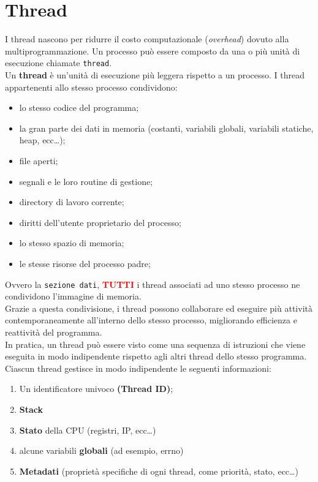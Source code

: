 \section{Thread}
I thread nascono per ridurre il costo computazionale (\textit{overhead}) dovuto alla multiprogrammazione.  
Un processo può essere composto da una o più unità di esecuzione chiamate \texttt{thread}.\\
Un \textbf{thread} è un'unità di esecuzione più leggera rispetto a un processo.  
I thread appartenenti allo stesso processo condividono:
\begin{itemize}
    \item lo stesso codice del programma;
    \item la gran parte dei dati in memoria (costanti, variabili globali,
    variabili statiche, heap, ecc\dots);
    \item file aperti;
    \item segnali e le loro routine di gestione;
    \item directory di lavoro corrente;
    \item diritti dell'utente proprietario del processo;
    \item lo stesso spazio di memoria;
    \item le stesse risorse del processo padre;
\end{itemize}
Ovvero la \texttt{sezione dati}, \textbf{\textcolor{red}{TUTTI}} i thread associati ad uno stesso processo ne condividono l'immagine di memoria.\\
Grazie a questa condivisione, i thread possono collaborare ed eseguire più attività contemporaneamente 
all'interno dello stesso processo, migliorando efficienza e reattività del programma.\\
In pratica, un thread può essere visto come una sequenza di istruzioni che viene 
eseguita in modo indipendente rispetto agli altri thread dello stesso programma.\\
Ciascun thread gestisce in modo indipendente le seguenti informazioni:
\begin{enumerate}
   \item Un identificatore univoco \textbf{(Thread ID)};
   \item \textbf{Stack}
   \item \textbf{Stato} della CPU (registri, IP, ecc\dots)
   \item alcune variabili \textbf{globali} (ad esempio, errno)
   \item \textbf{Metadati} (proprietà specifiche di ogni thread, come priorità, stato, ecc\dots)
\end{enumerate}
